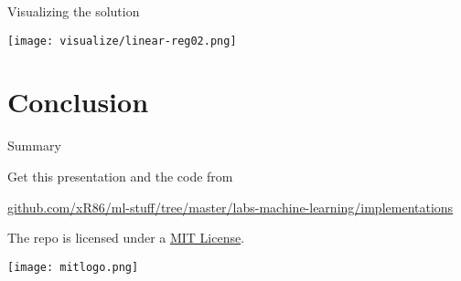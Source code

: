 \documentclass[10pt]{beamer}
\begin{document}
\begin{frame}{Visualizing the solution}
  \begin{center}\texttt{[image: visualize/linear-reg02.png]}\end{center}
\end{frame}

\section{Conclusion}

\begin{frame}{Summary}

  Get this presentation and the code from

  \begin{center}\url{github.com/xR86/ml-stuff/tree/master/labs-machine-learning/implementations}\end{center}

  The repo is licensed under a
  \href{https://github.com/xR86/ml-stuff/blob/master/LICENSE}{MIT License}.

  \begin{center}\texttt{[image: mitlogo.png]}\end{center}
  

\end{frame}
\end{document}
